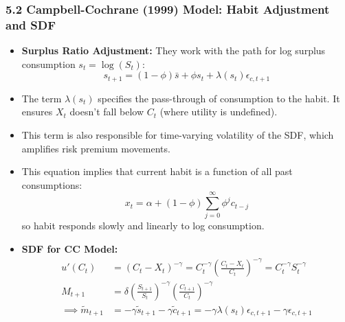 \documentclass{beamer}
\begin{document}
\begin{frame}
    \frametitle{5.2 Campbell-Cochrane (1999) Model: Habit Adjustment and SDF}
    \begin{itemize}
        \item \textbf{Surplus Ratio Adjustment:} They work with the path for log surplus consumption $s_t = \log(S_t)$:
        \[ s_{t+1} = (1-\phi)\bar{s} + \phi s_t + \lambda(s_t)\epsilon_{c,t+1} \]
        \item The term $\lambda(s_t)$ specifies the pass-through of consumption to the habit. It ensures $X_t$ doesn't fall below $C_t$ (where utility is undefined).
        \item This term is also responsible for time-varying volatility of the SDF, which amplifies risk premium movements.
        \item This equation implies that current habit is a function of all past consumptions:
        \[ x_t = \alpha + (1-\phi) \sum_{j=0}^{\infty} \phi^j c_{t-j} \]
        so habit responds slowly and linearly to log consumption.
        \item \textbf{SDF for CC Model:}
        \begin{align*}
            u'(C_t) &= (C_t - X_t)^{-\gamma} = C_t^{-\gamma} \left( \frac{C_t - X_t}{C_t} \right)^{-\gamma} = C_t^{-\gamma} S_t^{-\gamma} \\
            M_{t+1} &= \delta \left( \frac{S_{t+1}}{S_t} \right)^{-\gamma} \left( \frac{C_{t+1}}{C_t} \right)^{-\gamma} \\
            \implies \tilde{m}_{t+1} &= -\gamma\tilde{s}_{t+1} - \gamma\tilde{c}_{t+1} = -\gamma\lambda(s_t)\epsilon_{c,t+1} - \gamma\epsilon_{c,t+1}
        \end{align*}
    \end{itemize}
\end{frame}
\end{document}
